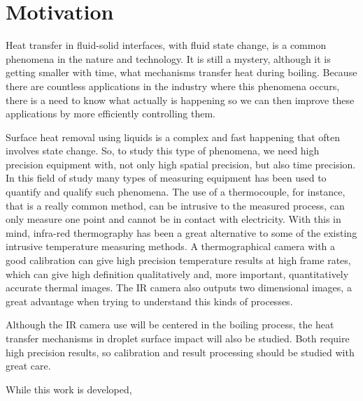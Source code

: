 \section{Motivation}
\label{sec:int_motivation}

\par Heat transfer in fluid-solid interfaces, with fluid state change, is a common phenomena in the nature and technology. It is still a mystery, although it is getting smaller with time, what mechanisms transfer heat during boiling. Because there are countless applications in the industry where this phenomena occurs, there is a need to know what actually is happening so we can then improve these applications by more efficiently controlling them.
\par Surface heat removal using liquids is a complex and fast happening that often involves state change. So, to study this type of phenomena, we need high precision equipment with, not only high spatial precision, but also time precision. In this field of study many types of measuring equipment has been used to quantify and qualify such phenomena. The use of a thermocouple, for instance, that is a really common method, can be intrusive to the measured process, can only measure one point and cannot be in contact with electricity. With this in mind, infra-red thermography has been a great alternative to some of the existing intrusive temperature measuring methods. A thermographical camera with a good calibration can give high precision temperature results at high frame rates, which can give high definition qualitatively and, more important, quantitatively accurate thermal images. The IR camera also outputs two dimensional images, a great advantage when trying to understand this kinds of processes.
\par Although the IR camera use will be centered in the boiling process, the heat transfer mechanisms in droplet surface impact will also be studied. Both require high precision results, so calibration and result processing should be studied with great care. 
\par While this work is developed,  